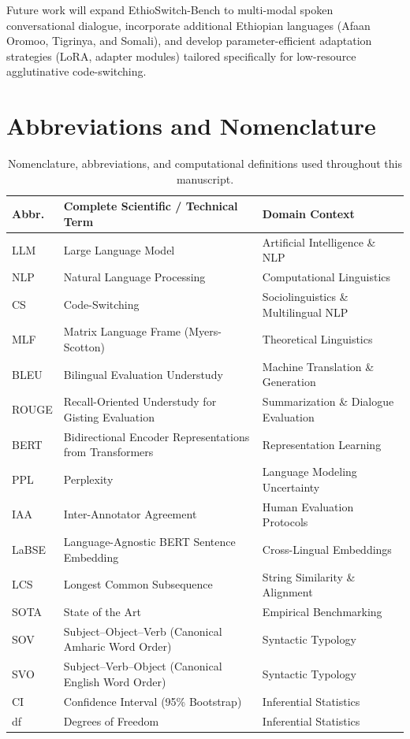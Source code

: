 \documentclass[11pt,a4paper]{article}
\begin{document}
Future work will expand EthioSwitch-Bench to multi-modal spoken conversational dialogue, incorporate additional Ethiopian languages (Afaan Oromoo, Tigrinya, and Somali), and develop parameter-efficient adaptation strategies (LoRA, adapter modules) tailored specifically for low-resource agglutinative code-switching.

\section*{Abbreviations and Nomenclature}

\begin{table}[htbp]
\centering
\small
\caption{Nomenclature, abbreviations, and computational definitions used throughout this manuscript.}
\label{tab:abbreviations}
\begin{tabularx}{\textwidth}{lp{6.5cm}X}
\toprule
\textbf{Abbr.} & \textbf{Complete Scientific / Technical Term} & \textbf{Domain Context} \\
\midrule
LLM & Large Language Model & Artificial Intelligence \& NLP \\
NLP & Natural Language Processing & Computational Linguistics \\
CS & Code-Switching & Sociolinguistics \& Multilingual NLP \\
MLF & Matrix Language Frame (Myers-Scotton) & Theoretical Linguistics \\
BLEU & Bilingual Evaluation Understudy & Machine Translation \& Generation \\
ROUGE & Recall-Oriented Understudy for Gisting Evaluation & Summarization \& Dialogue Evaluation \\
BERT & Bidirectional Encoder Representations from Transformers & Representation Learning \\
PPL & Perplexity & Language Modeling Uncertainty \\
IAA & Inter-Annotator Agreement & Human Evaluation Protocols \\
LaBSE & Language-Agnostic BERT Sentence Embedding & Cross-Lingual Embeddings \\
LCS & Longest Common Subsequence & String Similarity \& Alignment \\
SOTA & State of the Art & Empirical Benchmarking \\
SOV & Subject--Object--Verb (Canonical Amharic Word Order) & Syntactic Typology \\
SVO & Subject--Verb--Object (Canonical English Word Order) & Syntactic Typology \\
CI & Confidence Interval (95\% Bootstrap) & Inferential Statistics \\
df & Degrees of Freedom & Inferential Statistics \\
\bottomrule
\end{tabularx}
\end{table}
\end{document}
